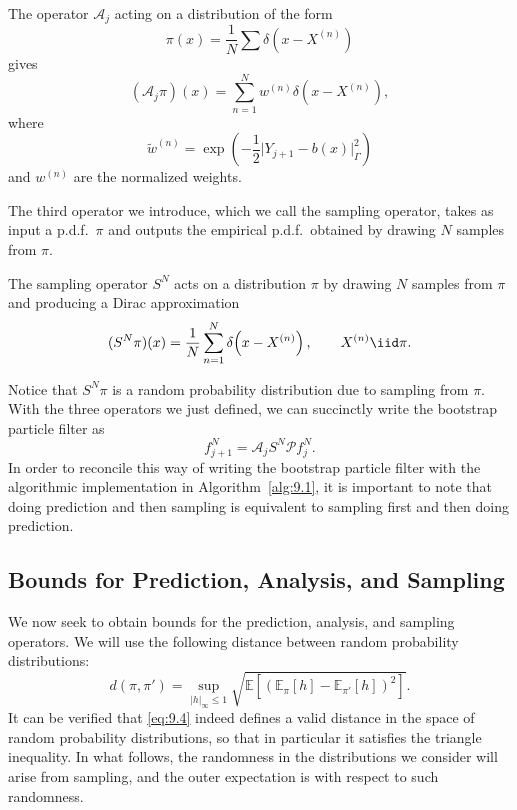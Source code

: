 \begin{remark}
  \label{rem:9.3}
  The operator $\mathcal{A}_j$ acting on a distribution of the form
  \[
    \pi(x) = \frac{1}{N} \sum \delta\!\left(x - X^{(n)}\right)
  \]
  gives
  \[
    (\mathcal{A}_j \pi)(x) = \sum_{n=1}^{N} w^{(n)} \delta\!\left(x - X^{(n)}\right),
  \]
  where
  \[
    \tilde{w}^{(n)} = \exp\!\left(-\frac{1}{2}\bigl|Y_{j+1} - b(x)\bigr|_\Gamma^2\right)
  \]
  and $w^{(n)}$ are the normalized weights.
\end{remark}

The third operator we introduce, which we call the sampling operator, takes as input a
p.d.f.\ $\pi$ and outputs the empirical p.d.f.\ obtained by drawing $N$ samples from
$\pi$.

\begin{definition}
  \label{def:9.4}
  The sampling operator $S^N$ acts on a distribution $\pi$ by drawing $N$ samples from
  $\pi$ and producing a Dirac approximation
  \[
    (S^N \pi)(x) = \frac{1}{N} \sum_{n=1}^{N} \delta\!\left(x - X^{(n)}\right),
    \qquad X^{(n)} \iid \pi.
  \]
\end{definition}

Notice that $S^N \pi$ is a random probability distribution due to sampling from $\pi$.
With the three operators we just defined, we can succinctly write the bootstrap particle
filter as
\begin{equation}
  \label{eq:9.3}
  f_{j+1}^N = \mathcal{A}_j S^N \mathcal{P} f_j^N.
\end{equation}
In order to reconcile this way of writing the bootstrap particle filter with the
algorithmic implementation in Algorithm~\ref{alg:9.1}, it is important to note that doing
prediction and then sampling is equivalent to sampling first and then doing prediction.

\subsection{Bounds for Prediction, Analysis, and Sampling}
\label{sec:9.2.2}

We now seek to obtain bounds for the prediction, analysis, and sampling operators. We will
use the following distance between random probability distributions:
\begin{equation}
  \label{eq:9.4}
  d(\pi, \pi') = \sup_{|h|_\infty \leq 1}
    \sqrt{\mathbb{E}\!\left[\left(\mathbb{E}_\pi[h] - \mathbb{E}_{\pi'}[h]\right)^2\right]}.
\end{equation}
It can be verified that \eqref{eq:9.4} indeed defines a valid distance in the space of
random probability distributions, so that in particular it satisfies the triangle
inequality. In what follows, the randomness in the distributions we consider will arise
from sampling, and the outer expectation is with respect to such randomness.

